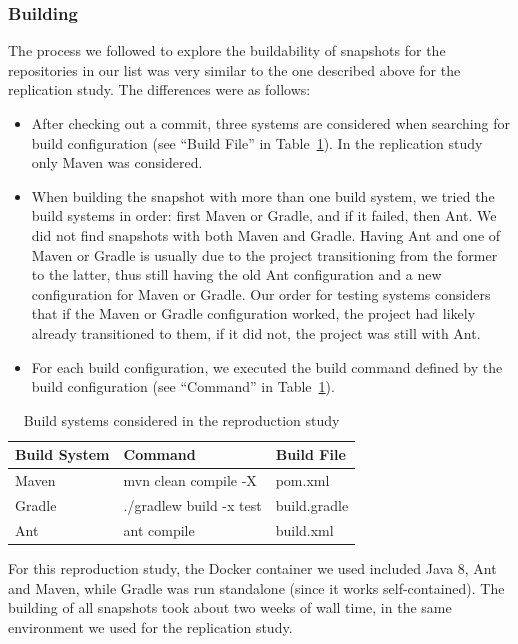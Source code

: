 \subsubsection{Building}

The process we followed to explore the buildability of snapshots for the repositories in our list was very similar to the one described above for the replication study. The differences were as follows:

\begin{itemize}
\item After checking out a commit, three systems are considered when searching for build configuration (see ``Build File'' in Table~\ref{table:buildSystems}). In the replication study only Maven was considered.
\item When building the snapshot with more than one build system, we tried the build systems in order: first Maven or Gradle, and if it failed, then Ant. We did not find snapshots with both Maven and Gradle. Having Ant and one of Maven or Gradle is usually due to the project transitioning from the former to the latter, thus still having the old Ant configuration and a new configuration for Maven or Gradle. Our order for testing systems considers that if the Maven or Gradle configuration worked, the project had likely already transitioned to them, if it did not, the project was still with Ant.
\item For each build configuration, we executed the build command defined by the build configuration (see ``Command'' in Table~\ref{table:buildSystems}).
\end{itemize}

\begin{table}[h]
  \caption{Build systems considered in the reproduction study}
  \label{table:buildSystems}
  \centering
  \begin{tabular*}{\textwidth}{@{\extracolsep{\fill}}lll}
    \toprule
    \bf{Build System} & \bf{Command} & \bf{Build File}\\
    \midrule
    Maven & mvn clean compile -X & pom.xml\\
    Gradle & ./gradlew build -x test & build.gradle \\
    Ant & ant compile  & build.xml \\
    \midrule
  \end{tabular*}
\end{table}
 
For this reproduction study, the Docker container we used included Java 8, Ant and Maven, while Gradle was run standalone (since it works self-contained). 
The building of all snapshots took about two weeks of wall time, in the same environment we used for the replication study.


